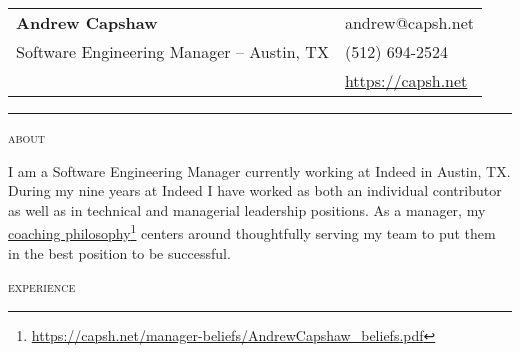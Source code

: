 \documentclass[11pt]{amsart}
\begin{document}
\thispagestyle{empty}

\begin{tabularx}{\textwidth}{@{}Xl@{}}
 \textbf{Andrew Capshaw} & andrew@capsh.net \\
 Software Engineering Manager – Austin, TX & (512) 694-2524 \\
& \href{https://capsh.net}{https://capsh.net} \\
\end{tabularx}
\bigskip

\bigskip
\hrule depth 0.5pt

\begingroup
\setlength{\tabcolsep}{10pt} %
\renewcommand{\arraystretch}{1.5} %

\bigskip
\textsc{about}

I am a Software Engineering Manager currently working at Indeed in Austin, TX. During my nine years at Indeed I have worked as both an individual contributor as well as in technical and managerial leadership positions. As a manager, my \href{https://capsh.net/manager-beliefs/AndrewCapshaw_beliefs.pdf}{coaching philosophy}\footnote{\url{https://capsh.net/manager-beliefs/AndrewCapshaw_beliefs.pdf}} centers around thoughtfully serving my team to put them in the best position to be successful.

\bigskip
\textsc{experience}
\end{document}

